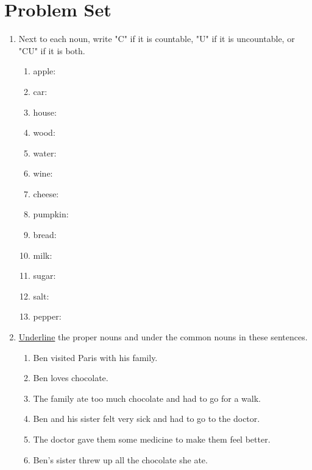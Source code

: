 \documentclass{tufte-book}
\begin{document}
\clearpage\section{Problem Set }

\begin{enumerate}
  \item {}
  Next to each noun, write "C" if it is countable, "U" if it is uncountable, or "CU" if it is both.
  \begin{multicols}{3}
  \begin{enumerate}
    \item apple: \dotfill
    \item car: \dotfill
    \item house: \dotfill
    \item wood: \dotfill
    \item water: \dotfill
    \item wine: \dotfill
    \item cheese: \dotfill
    \item pumpkin: \dotfill
    \item bread: \dotfill
    \item milk: \dotfill
    \item sugar: \dotfill
    \item salt: \dotfill
    \item pepper: \dotfill
  \end{enumerate}
  \end{multicols}

  \item \underline{Underline} the proper nouns and  under the common nouns in these sentences.
  \begin{enumerate}
    \item Ben visited Paris with his family.
    \item Ben loves chocolate.
    \item The family ate too much chocolate and had to go for a walk.
    \item Ben and his sister felt very sick and had to go to the doctor.
    \item The doctor gave them some medicine to make them feel better.
    \item Ben's sister threw up all the chocolate she ate.
  \end{enumerate}


\end{enumerate}
\end{document}
